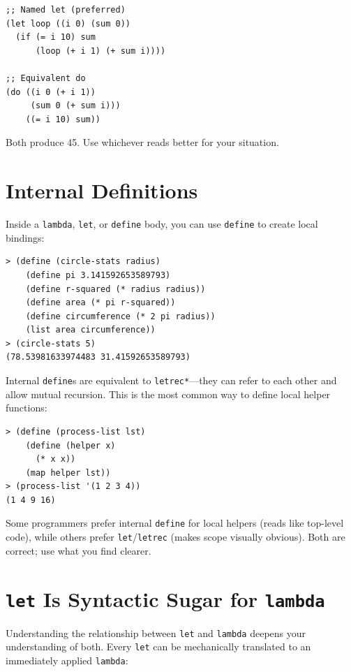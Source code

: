 \begin{lstlisting}
;; Named let (preferred)
(let loop ((i 0) (sum 0))
  (if (= i 10) sum
      (loop (+ i 1) (+ sum i))))

;; Equivalent do
(do ((i 0 (+ i 1))
     (sum 0 (+ sum i)))
    ((= i 10) sum))
\end{lstlisting}

Both produce 45. Use whichever reads better for your situation.

\section{Internal Definitions}

Inside a \texttt{lambda}, \texttt{let}, or \texttt{define} body, you can use \texttt{define} to create local bindings:

\begin{lstlisting}[style=repl]
> (define (circle-stats radius)
    (define pi 3.141592653589793)
    (define r-squared (* radius radius))
    (define area (* pi r-squared))
    (define circumference (* 2 pi radius))
    (list area circumference))
> (circle-stats 5)
(78.53981633974483 31.41592653589793)
\end{lstlisting}

Internal \texttt{define}s are equivalent to \texttt{letrec*}---they can refer to each other and allow mutual recursion. This is the most common way to define local helper functions:

\begin{lstlisting}[style=repl]
> (define (process-list lst)
    (define (helper x)
      (* x x))
    (map helper lst))
> (process-list '(1 2 3 4))
(1 4 9 16)
\end{lstlisting}

\begin{note}
Some programmers prefer internal \texttt{define} for local helpers (reads like top-level code), while others prefer \texttt{let}/\texttt{letrec} (makes scope visually obvious). Both are correct; use what you find clearer.
\end{note}

\section{\texttt{let} Is Syntactic Sugar for \texttt{lambda}}

Understanding the relationship between \texttt{let} and \texttt{lambda} deepens your understanding of both. Every \texttt{let} can be mechanically translated to an immediately applied \texttt{lambda}:

